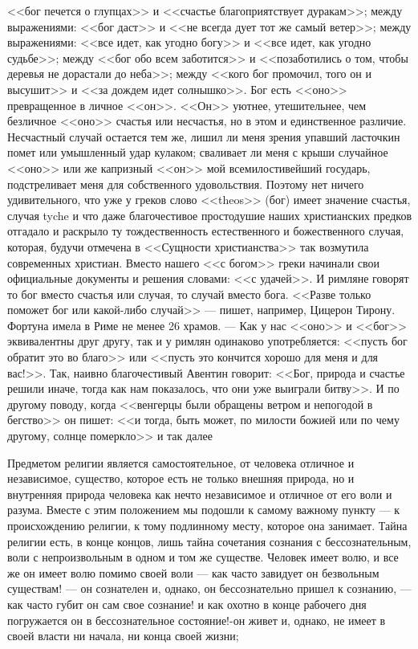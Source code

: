 \documentclass[12pt]{article}
\begin{document}
<<бог печется о глупцах>> и <<счастье благоприятствует дуракам>>; между выражениями: <<бог даст>> и <<не всегда дует тот же самый ветер>>; между выражениями: <<все идет, как угодно богу>> и <<все идет, как угодно судьбе>>; между <<бог обо всем заботится>> и <<позаботились о том, чтобы деревья не дорастали до неба>>; между <<кого бог промочил, того он и высушит>> и <<за дождем идет солнышко>>. Бог есть <<оно>>  превращенное в личное <<он>>. <<Он>> уютнее, утешительнее, чем безличное <<оно>> счастья или несчастья, но в этом и единственное различие. Несчастный случай остается тем же, лишил ли меня зрения упавший ласточкин помет или умышленный удар кулаком; сваливает ли меня с крыши случайное <<оно>>  или же капризный <<он>>  мой всемилостивейший государь, подстреливает меня для собственного удовольствия. Поэтому нет ничего удивительного, что уже у греков слово <<theos>> (бог) имеет значение счастья, случая tyche и что даже благочестивое простодушие наших христианских предков отгадало и раскрыло ту тождественность естественного и божественного случая, которая, будучи отмечена в <<Сущности христианства>>  так возмутила современных христиан. Вместо нашего <<с богом>> греки начинали свои официальные документы и решения словами: <<с удачей>>. И римляне говорят то бог вместо счастья или случая, то случай вместо бога. <<Разве только поможет бог или какой-либо случай>>  --- пишет, например, Цицерон Тирону. Фортуна имела в Риме не менее 26 храмов. --- Как у нас <<оно>> и <<бог>> эквивалентны друг другу, так и у римлян одинаково употребляется: <<пусть бог обратит это во благо>> или <<пусть это кончится хорошо для меня и для вас!>>. Так, наивно благочестивый Авентин говорит: <<Бог, природа и счастье решили иначе, тогда как нам показалось, что они уже выиграли битву>>. И по другому поводу, когда <<венгерцы были обращены ветром и непогодой в бегство>>  он пишет: <<и тогда, быть может, по милости божией или по чему другому, солнце померкло>> и так далее 

Предметом религии является самостоятельное, от человека отличное и независимое, существо, которое есть не только внешняя природа, но и внутренняя природа человека как нечто независимое и отличное от его воли и разума. Вместе с этим положением мы подошли к самому важному пункту --- к происхождению религии, к тому подлинному месту, которое она занимает. Тайна религии есть, в конце концов, лишь тайна сочетания сознания с бессознательным, воли с непроизвольным в одном и том же существе. Человек имеет волю, и все же он имеет волю помимо своей воли --- как часто завидует он безвольным существам! --- он сознателен и, однако, он бессознательно пришел к сознанию, --- как часто губит он сам свое сознание! и как охотно в конце рабочего дня погружается он в бессознательное состояние!-он живет и, однако, не имеет в своей власти ни начала, ни конца своей жизни; 
\end{document}
